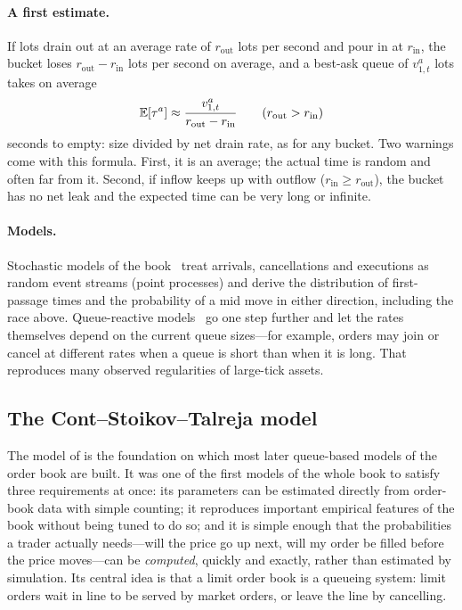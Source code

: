 \paragraph{A first estimate.} If lots drain out at an average rate of $r_{\text{out}}$ lots per
second and pour in at $r_{\text{in}}$, the bucket loses $r_{\text{out}} - r_{\text{in}}$ lots per
second on average, and a best-ask queue of $v^a_{1,t}$ lots takes on average
\[
  \mathbb{E}[\tau^a] \approx \frac{v^a_{1,t}}{r_{\text{out}} - r_{\text{in}}}
  \qquad (r_{\text{out}} > r_{\text{in}})
\]
seconds to empty: size divided by net drain rate, as for any bucket. Two warnings come with this
formula. First, it is an average; the actual time is random and often far from it. Second, if
inflow keeps up with outflow ($r_{\text{in}} \ge r_{\text{out}}$), the bucket has no net leak and the
expected time can be very long or infinite.

\paragraph{Models.} Stochastic models of the book~\citep{cst2010} treat arrivals, cancellations
and executions as random event streams (point processes) and derive the distribution of
first-passage times and the probability of a mid move in either direction, including the race above.
Queue-reactive models~\citep{huang2015} go one step further and let the rates themselves depend on
the current queue sizes---for example, orders may join or cancel at different rates when a queue is
short than when it is long. That reproduces many observed regularities of large-tick assets.

\subsection{The Cont--Stoikov--Talreja model}
\label{sec:cst}

The model of \citet{cst2010} is the foundation on which most later queue-based models of the
order book are built. It was one of the first models of the whole book to
satisfy three requirements at once: its parameters can be estimated directly from order-book
data with simple counting; it reproduces important empirical features of the book without being tuned
to do so; and it is simple enough that the probabilities a trader actually needs---will the price go
up next, will my order be filled before the price moves---can be \emph{computed}, quickly and exactly,
rather than estimated by simulation. Its central idea is that a limit order book is a queueing
system: limit orders wait in line to be served by market orders, or leave the line by cancelling.

